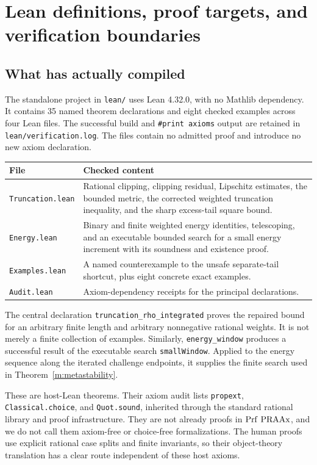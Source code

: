 \section{Lean definitions, proof targets, and verification boundaries}
\label{sec:lean}

\subsection{What has actually compiled}

The standalone project in \texttt{lean/} uses Lean 4.32.0, with no
Mathlib dependency. It contains 35 named theorem declarations and eight
checked examples across four Lean files. The successful build and
\texttt{\#print axioms} output are retained in
\texttt{lean/verification.log}. The files contain no admitted proof and
introduce no new axiom declaration.

\begin{center}
\begin{tabular}{p{}p{}}
\toprule
File & Checked content \\
\midrule
\texttt{Truncation.lean} & Rational clipping, clipping residual,
Lipschitz estimates, the bounded metric, the corrected weighted
truncation inequality, and the sharp excess-tail square bound. \\
\texttt{Energy.lean} & Binary and finite weighted energy identities,
telescoping, and an executable bounded search for a small energy
increment with its soundness and existence proof. \\
\texttt{Examples.lean} & A named counterexample to the unsafe
separate-tail shortcut, plus eight concrete exact examples. \\
\texttt{Audit.lean} & Axiom-dependency receipts for the principal
declarations. \\
\bottomrule
\end{tabular}
\end{center}

The central declaration
\texttt{truncation\_rho\_integrated} proves the repaired bound for an
arbitrary finite length and arbitrary nonnegative rational weights.
It is not merely a finite collection of examples. Similarly,
\texttt{energy\_window} produces a successful result of the executable
search \texttt{smallWindow}. Applied to the energy sequence along the
iterated challenge endpoints, it supplies the finite search used in
Theorem~\ref{m:metastability}.

These are host-Lean theorems. Their axiom audit lists
\texttt{propext}, \texttt{Classical.choice}, and
\texttt{Quot.sound}, inherited through the standard rational library
and proof infrastructure. They are not already proofs in
\(\operatorname{Prf}\,\mathrm{PRAAx}\), and we do not call them axiom-free or
choice-free formalizations. The human proofs use explicit rational
case splits and finite invariants, so their object-theory translation
has a clear route independent of these host axioms.

